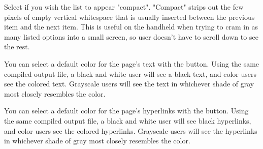  Select if you wish the list to appear 
"compact". "Compact" strips out the few pixels of empty vertical whitespace 
that is usually inserted between the previous item and the next item. This is 
useful on the handheld when trying to cram in as many listed options into a
small screen, so user doesn't have to scroll down to see the rest. 
\notimplemented


 You can select a default color for the 
page's text with the  button. Using the same 
compiled output file, a black and white user will see a black text, and 
color users see the colored text. Grayscale users will see the text in 
whichever shade of gray most closely resembles the color.

 You can select a default color for the 
page's hyperlinks with the  button. Using the 
same compiled output file, a black and white user will see black 
hyperlinks, and color users see the colored hyperlinks. Grayscale users will 
see the hyperlinks in whichever shade of gray most closely resembles the 
color.





